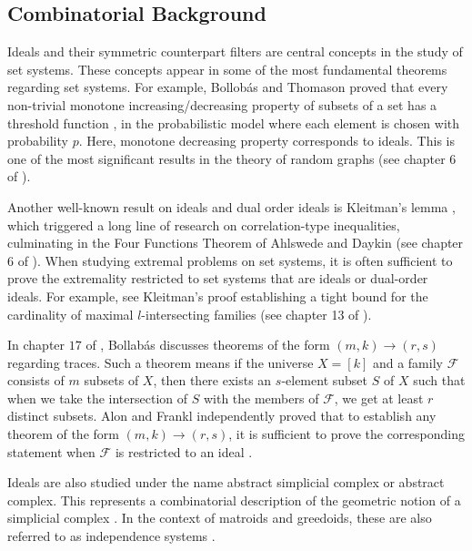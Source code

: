 \documentclass[11pt,a4paper]{article}
\theoremstyle{definition}
\begin{document}
\subsection{Combinatorial Background}
Ideals and their symmetric counterpart filters are central 
concepts in the study of set systems. These concepts appear 
in some of the most fundamental theorems regarding set systems. 
For example, Bollobás and Thomason proved that every non-trivial 
monotone increasing/decreasing property of subsets of a set has 
a threshold function \cite{ThresholdF}, in the probabilistic 
model where each element is chosen with probability $p$. Here, 
monotone decreasing property corresponds to ideals. This is one 
of the most significant results in the theory of random graphs 
(see chapter $6$ of \cite{bollobasbook}).

Another well-known result on ideals and dual order ideals is 
Kleitman's lemma \cite{kleitman}, which triggered a long line 
of research on correlation-type inequalities, culminating in 
the Four Functions Theorem of Ahlswede and Daykin 
\cite{fourfunction} (see chapter $6$ of \cite{alonspencer}). 
When studying extremal problems on set systems, it is often 
sufficient to prove the extremality restricted to set systems 
that are ideals or dual-order ideals. For example, see 
Kleitman's proof establishing a tight bound for the cardinality 
of maximal $l$-intersecting families \cite{KLEITMAN1966209} 
(see chapter 13 of \cite{bollobasbook}).

In chapter $17$ of \cite{bollobasbook}, Bollab\'as discusses 
theorems of the form $(m,k) \rightarrow (r,s)$ regarding traces. 
Such a theorem means if the universe $X = [k]$ and a family 
$\mathcal{F}$ consists of $m$ subsets of $X$, then there exists 
an $s$-element subset $S$ of $X$ such that when we take the 
intersection of $S$ with the members of $\mathcal{F}$, we get 
at least $r$ distinct subsets. Alon \cite{ALON1983199} and 
Frankl \cite{Frankl1983OnTT} independently proved that to 
establish any theorem of the form $(m,k) \rightarrow (r,s)$, 
it is sufficient to prove the corresponding statement when 
$\mathcal{F}$ is restricted to an ideal \cite{Frankl1983OnTT}.

Ideals are also studied under the name abstract simplicial 
complex or abstract complex. This represents a combinatorial 
description of the geometric notion of a simplicial complex 
\cite{Lee_2011}. In the context of matroids and greedoids, 
these are also referred to as independence systems 
\cite{Korte_Schrader_Lovasz_1991}.
\end{document}
